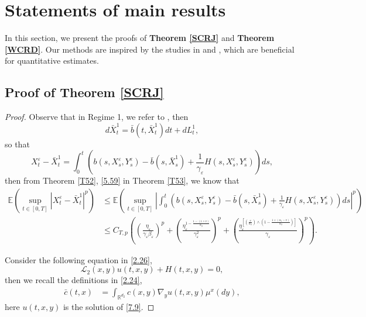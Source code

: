 \documentclass[11pt,reqno]{amsart}
\numberwithin{equation}{section}
\begin{document}
\section{Statements of main results}

In this section, we present the proofs of \textbf{Theorem  \ref{SCRJ}} and \textbf{Theorem  \ref{WCRD}}. Our methods are inspired by the studies in \cite{CEB} and \cite{SXX}, which are beneficial for quantitative estimates.

\subsection{Proof of \textbf{Theorem \ref{SCRJ}} }
\begin{proof}
	Observe that in Regime 1, we refer to \cite[Section 4.1, 356]{SXX}, then
	\begin{equation}\label{7.1}
		d\bar{X}^{1}_{t}=\bar{b}(t,\bar{X}^{1}_{t})dt+dL_{t}^{1},
	\end{equation}
	so that
	\begin{equation}
		X_{t}^{\varepsilon}-\bar{X}^{1}_{t}=\int_{0}^{t}\left( b(s,X_{s}^{\varepsilon},Y_{s}^{\varepsilon})-\bar{b}(s,\bar{X}^{1}_{s})+ \frac{1}{\gamma_{\varepsilon}}H(s,X_{s}^{\varepsilon},Y_{s}^{\varepsilon})\right)ds,\nonumber
	\end{equation}
	then  from Theorem \ref{T52}, \eqref{5.59} in Theorem \ref{T53}, we know that 
	\begin{equation}\label{7.6}
		\begin{split}
			\mathbb{E}\left( \sup_{t\in [0,T]}|X_{t}^{\varepsilon}-\bar{X}^{1}_{t}|^{p}\right)	&\leq\mathbb{E}\left( \sup_{t\in [0,T]}\left| \int_{0}^{t}\left( b(s,X_{s}^{\varepsilon},Y_{s}^{\varepsilon})-\bar{b}(s,\bar{X}^{1}_{s})+ \frac{1}{\gamma_{\varepsilon}}H(s,X_{s}^{\varepsilon},Y_{s}^{\varepsilon})\right) ds\right| ^{p}\right)\\
			&\leq  C_{T,p}\left(\left(  \frac{\eta_{\varepsilon}}{\gamma_{\varepsilon}\beta_{\varepsilon}}\right) ^{p}+\left(  \frac{\eta_{\varepsilon}^{1-\frac{1-(1\wedge v)}{\alpha_{2}}}}{\gamma_{\varepsilon}^{2}}\right) ^{p}+\left( \frac{\eta_{\varepsilon}^{\left[ \left( \frac{v}{\alpha_{2}}\right) \wedge \left( 1-\frac{1\vee(\alpha_{1}-v)}{\alpha_{2}}\right) \right] }}{\gamma_{\varepsilon} } \right) ^{p}\right).
		\end{split}\nonumber
	\end{equation}

		Consider the following equation in \eqref{2.26},
	\begin{equation}\label{7.9}
		\mathcal{L}_{2}(x,y)u(t,x,y)+ H(t,x,y)=0,
	\end{equation}
	then we recall the definitions in \eqref{2.24},
	\begin{equation}
		\begin{split}
			\bar{c}(t,x)&=\int_{\mathbb{R}^{ d_{2}}}c(x,y)\nabla_{y}u(t,x,y)\mu^{x}(dy),
		\end{split}	\nonumber
	\end{equation}
	here $u(t,x,y)$ is the solution of \eqref{7.9}.
	

\end{proof}
\end{document}

